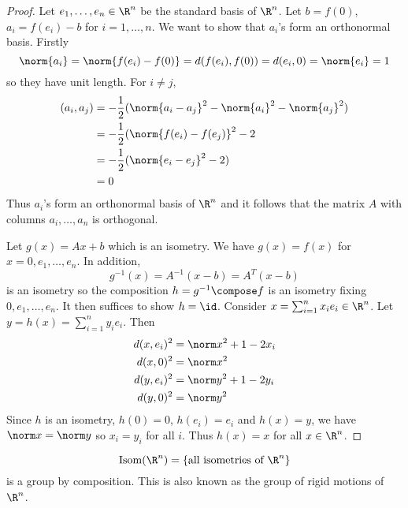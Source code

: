 \documentclass[a4paper]{article}
\DeclareMathOperator{\Isom}{Isom}
\begin{document}
\begin{proof}
  Let \(e_1, \dots, e_n \in \R^n\) be the standard basis of \(\R^n\). Let \(b = f(0)\), \(a_i = f(e_i) - b\) for \(i = 1, \dots, n\). We want to show that \(a_i\)'s form an orthonormal basis. Firstly
  \[
    \norm{a_i} = \norm{f(e_i) - f(0)} = d(f(e_i), f(0)) = d(e_i, 0) = \norm{e_i} = 1
  \]
  so they have unit length. For \(i \neq j\),
  \begin{align*}
    (a_i, a_j) &= -\frac{1}{2}(\norm{a_i - a_j}^2 - \norm{a_i}^2 - \norm{a_j}^2) \\
               &= -\frac{1}{2}(\norm{f(e_i) - f(e_j)}^2 - 2 \\
               &= -\frac{1}{2}(\norm{e_i - e_j}^2 - 2) \\
               &= 0
  \end{align*}
  Thus \(a_i\)'s form an orthonormal basis of \(\R^n\) and it follows that the matrix \(A\) with columns \(a_i, \dots, a_n\) is orthogonal.

  Let \(g(x) = Ax + b\) which is an isometry. We have \(g(x) = f(x)\) for \(x = 0, e_1, \dots, e_n\). In addition,
  \[
    g^{-1}(x) = A^{-1}(x - b) = A^T(x - b)
  \]
  is an isometry so the composition \(h = g^{-1} \compose f\) is an isometry fixing \(0, e_1, \dots, e_n\). It then suffices to show \(h = \id\). Consider \(x = \sum_{i = 1}^n x_ie_i \in \R^n\). Let \(y = h(x) = \sum_{i = 1}^n y_ie_i\). Then
\begin{align*}
  d(x, e_i)^2 &= \norm x^2 + 1 - 2x_i \\
  d(x, 0)^2 &= \norm x^2 \\
  d(y, e_i)^2 &= \norm y^2 + 1 - 2y_i \\
  d(y, 0)^2 &= \norm y^2
\end{align*}
Since \(h\) is an isometry, \(h(0) = 0\), \(h(e_i) = e_i\) and \(h(x) = y\), we have \(\norm x = \norm y\) so \(x_i = y_i\) for all \(i\). Thus \(h(x) = x\) for all \(x \in \R^n\).
\end{proof}

\begin{remark}
  \[
    \Isom(\R^n) = \{\text{all isometries of } \R^n\}
  \]
  is a group by composition. This is also known as the group of rigid motions of \(\R^n\).
\end{remark}
\end{document}
